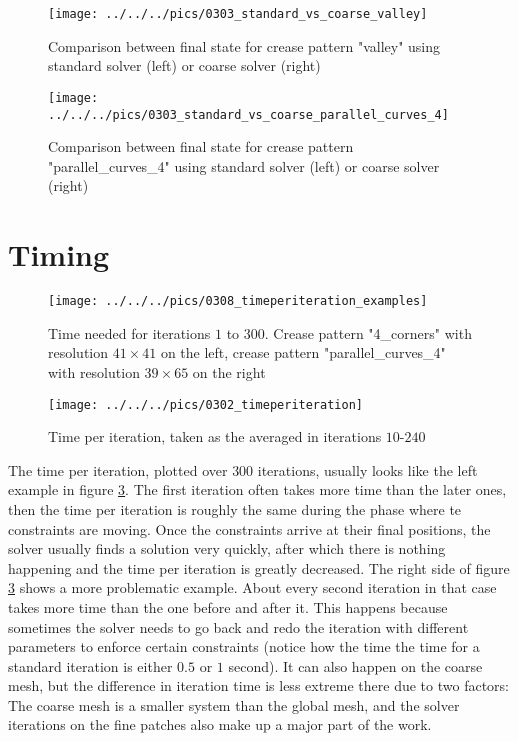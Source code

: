 \documentclass[a4paper,twoside,12pt,nochapterprefix]{scrbook}
\begin{document}
\begin{figure}
    \centering
    \texttt{[image: ../../../pics/0303\_standard\_vs\_coarse\_valley]}
    \caption{Comparison between final state for crease pattern "valley" using standard solver (left) or coarse solver (right)}
      \label{fig:results_compare_valley}
\end{figure}
\begin{figure}
    \centering
    \texttt{[image: ../../../pics/0303\_standard\_vs\_coarse\_parallel\_curves\_4]}
    \caption{Comparison between final state for crease pattern "parallel\_curves\_4" using standard solver (left) or coarse solver (right)}
      \label{fig:results_compare_curves}
\end{figure}
\section{Timing}
\begin{figure}
    \centering
    \texttt{[image: ../../../pics/0308\_timeperiteration\_examples]}
    \caption{Time needed for iterations $1$ to $300$. Crease pattern "4\_corners" with resolution $41 \times 41$ on the left, crease pattern "parallel\_curves\_4" with resolution $39 \times 65$ on the right}
    \label{fig:results_cornerstime}
\end{figure}
\begin{figure}
    \centering
    \texttt{[image: ../../../pics/0302\_timeperiteration]}
    \caption{Time per iteration, taken as the averaged in iterations $10$-$240$}
      \label{fig:results_timeperiteration}
\end{figure}
The time per iteration, plotted over $300$ iterations, usually looks like the left example in figure \ref{fig:results_cornerstime}. The first iteration often takes more time than the later ones, then the time per iteration is roughly the same during the phase where te constraints are moving. Once the constraints arrive at their final positions, the solver usually finds a solution very quickly, after which there is nothing happening and the time per iteration is greatly decreased.\newline
The right side of figure \ref{fig:results_cornerstime} shows a more problematic example. About every second iteration in that case takes more time than the one before and after it. This happens because sometimes the solver needs to go back and redo the iteration with different parameters to enforce certain constraints (notice how the time the time for a standard iteration is either $0.5$ or $1$ second). It can also happen on the coarse mesh, but the difference in iteration time is less extreme there due to two factors: The coarse mesh is a smaller system than the global mesh, and the solver iterations on the fine patches also make up a major part of the work.\newline
\end{document}
